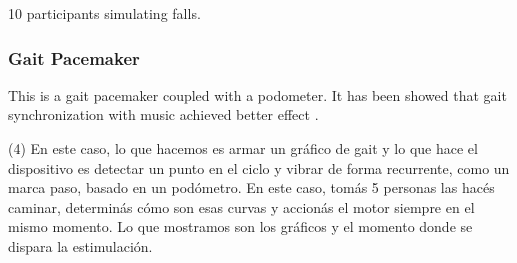 \documentclass[conference]{IEEEtran}
\begin{document}
10 participants simulating falls.

\subsubsection{Gait Pacemaker}

This is a gait pacemaker coupled with a podometer.  It has been showed that gait synchronization with music achieved better effect \cite{Roerdink.etal2007}.

(4) En este caso, lo que hacemos es armar un gráfico de gait y lo que hace el dispositivo es detectar un punto en el ciclo y vibrar de forma recurrente, como un marca paso, basado en un podómetro.  En este caso, tomás 5 personas las hacés caminar, determinás cómo son esas curvas y accionás el motor siempre en el mismo momento.  Lo que mostramos son los gráficos y el momento donde se dispara la estimulación.
\end{document}

